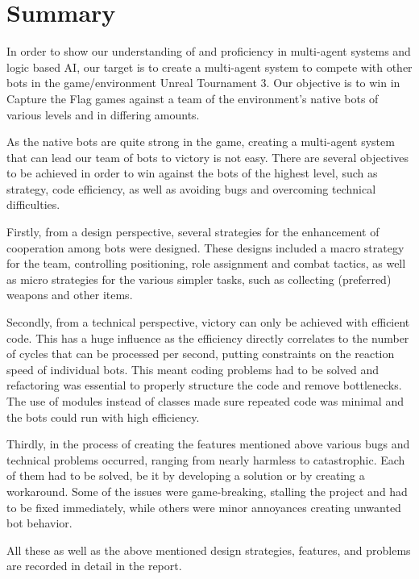\chapter*{Summary}
In order to show our understanding of and proficiency in multi-agent systems and logic based AI, our target is to create a multi-agent system to compete with other bots in the game/environment Unreal Tournament 3. Our objective is to win in Capture the Flag games against a team of the environment's native bots of various levels and in differing amounts.
 
As the native bots are quite strong in the game, creating a multi-agent system that can lead our team of bots to victory is not easy. There are several objectives to be achieved in order to win against the bots of the highest level, such as strategy, code efficiency, as well as avoiding bugs and overcoming technical difficulties.

Firstly, from a design perspective, several strategies for the enhancement of cooperation among bots were designed. These designs included a macro strategy for the team, controlling positioning, role assignment and combat tactics, as well as micro strategies for the various simpler tasks, such as collecting (preferred) weapons and other items.

Secondly, from a technical perspective, victory can only be achieved with efficient code. This has a huge influence as the efficiency directly correlates to the number of cycles that can be processed per second, putting constraints on the reaction speed of individual bots. This meant coding problems had to be solved and refactoring was essential to properly structure the code and remove bottlenecks. The use of modules instead of classes made sure repeated code was minimal and the bots could run with high efficiency. 

Thirdly, in the process of creating the features mentioned above various bugs and technical problems occurred, ranging from nearly harmless to catastrophic. Each of them had to be solved, be it by developing a solution or by creating a workaround. Some of the issues were game-breaking, stalling the project and had to be fixed immediately, while others were minor annoyances creating unwanted bot behavior.

All these as well as the above mentioned design strategies, features, and problems are recorded in detail in the report.
